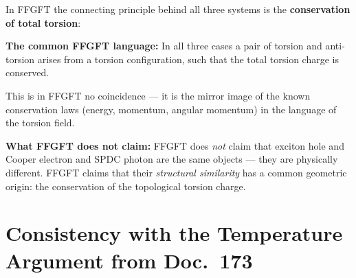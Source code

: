 \begin{foundation}
In FFGFT the connecting principle behind all three systems is
the \textbf{conservation of total torsion}:

\begin{center}
\end{center}

\textbf{The common FFGFT language:}
In all three cases a pair of torsion and anti-torsion arises
from a torsion configuration, such that the
total torsion charge is conserved.

This is in FFGFT no coincidence --- it is the mirror image
of the known conservation laws (energy, momentum, angular momentum)
in the language of the torsion field.

\textbf{What FFGFT does not claim:}
FFGFT does \emph{not} claim that exciton hole and
Cooper electron and SPDC photon are the same objects ---
they are physically different.
FFGFT claims that their \emph{structural similarity}
has a common geometric origin:
the conservation of the topological torsion charge.
\end{foundation}

\section{Consistency with the Temperature Argument from Doc.~173}
\label{sec:temperature}

